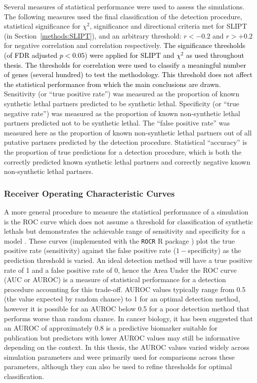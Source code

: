 Several measures of statistical performance were used to assess the simulations. The following measures used the final classification of the detection procedure, statistical significance for $\chi^2$, significance and directional criteria met for \gls{SLIPT} (in Section~\ref{methods:SLIPT}), and an arbitrary threshold: $r < -0.2$ and $r >+0.2$ for  negative correlation and correlation respectively. \textcolor{black}{The significance thresholds (of FDR adjusted $p<0.05$) were applied for SLIPT and $\chi^2$ as used throughout thesis. The thresholds for correlation were used to classify a meaningful number of genes (several hundred) to test the methodology. This threshold does not affect the statistical performance from which the main conclusions are drawn}. Sensitivity (or ``true positive rate'') was measured as the proportion of known \gls{synthetic lethal} partners predicted to be \gls{synthetic lethal}. Specificity (or ``true negative rate'') was measured as the proportion of known non-synthetic lethal partners predicted not to be \gls{synthetic lethal}. The ``false positive rate'' was measured here as the proportion of known non-synthetic lethal partners out of all putative partners predicted by the detection procedure. Statistical ``accuracy'' is the proportion of true predictions for a detection procedure, which is both the correctly predicted known \gls{synthetic lethal} partners and correctly negative known non-synthetic lethal partners.

\subsubsection{Receiver Operating Characteristic Curves} \label{methods:ROC}  
A more general procedure to measure the statistical performance of a simulation is the \gls{ROC} curve which does not assume a threshold for classification of \glspl{synthetic lethal} but demonstrates the achievable range of sensitivity and specificity for a model \citep{Zweig1993, Fawcett2006, Akobeng2007}. These curves (implemented with the \texttt{ROCR} R package \citep{ROCR}) plot the true positive rate (sensitivity) against the false positive rate ($1-$specificity) as the prediction threshold is varied. An ideal detection method will have a true positive rate of 1 and a false positive rate of 0, hence the Area Under the \gls{ROC} curve (AUC or \gls{AUROC}) is a measure of statistical performance for a detection procedure accounting for this trade-off. \gls{AUROC} values typically range from 0.5 (the value expected by random chance) to 1 for an optimal detection method, however it is possible for an \gls{AUROC} below 0.5 for a poor detection method that performs worse than random chance. In cancer biology, it has been suggested that an \gls{AUROC} of approximately $0.8$ is a predictive biomarker suitable for publication \citep{Hajian-Tilaki2013} but predictors with lower \gls{AUROC} values may still be informative depending on the context. In this thesis, the \gls{AUROC} values varied widely across simulation parameters and were primarily used for comparisons across these parameters, although they can also be used to refine thresholds for optimal classification. 

